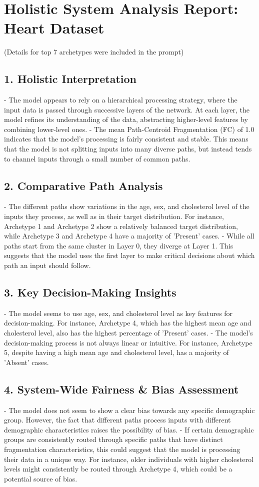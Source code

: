 \section*{Holistic System Analysis Report: Heart Dataset}
(Details for top 7 archetypes were included in the prompt)

\subsection*{1. Holistic Interpretation}
- The model appears to rely on a hierarchical processing strategy, where the input data is passed through successive layers of the network. At each layer, the model refines its understanding of the data, abstracting higher-level features by combining lower-level ones.
- The mean Path-Centroid Fragmentation (FC) of 1.0 indicates that the model's processing is fairly consistent and stable. This means that the model is not splitting inputs into many diverse paths, but instead tends to channel inputs through a small number of common paths.

\subsection*{2. Comparative Path Analysis}
- The different paths show variations in the age, sex, and cholesterol level of the inputs they process, as well as in their target distribution. For instance, Archetype 1 and Archetype 2 show a relatively balanced target distribution, while Archetype 3 and Archetype 4 have a majority of 'Present' cases.
- While all paths start from the same cluster in Layer 0, they diverge at Layer 1. This suggests that the model uses the first layer to make critical decisions about which path an input should follow.

\subsection*{3. Key Decision-Making Insights}
- The model seems to use age, sex, and cholesterol level as key features for decision-making. For instance, Archetype 4, which has the highest mean age and cholesterol level, also has the highest percentage of 'Present' cases.
- The model's decision-making process is not always linear or intuitive. For instance, Archetype 5, despite having a high mean age and cholesterol level, has a majority of 'Absent' cases.

\subsection*{4. System-Wide Fairness \& Bias Assessment}
- The model does not seem to show a clear bias towards any specific demographic group. However, the fact that different paths process inputs with different demographic characteristics raises the possibility of bias.
- If certain demographic groups are consistently routed through specific paths that have distinct fragmentation characteristics, this could suggest that the model is processing their data in a unique way. For instance, older individuals with higher cholesterol levels might consistently be routed through Archetype 4, which could be a potential source of bias.

